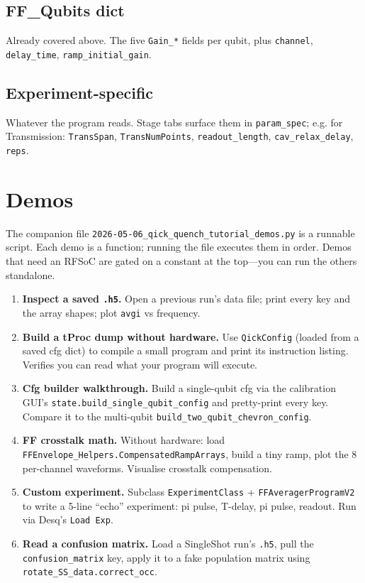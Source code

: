 \documentclass[11pt,letterpaper]{article}
\begin{document}
\subsection{FF\_Qubits dict}
Already covered above. The five \texttt{Gain\_*} fields per qubit, plus \texttt{channel}, \texttt{delay\_time}, \texttt{ramp\_initial\_gain}.

\subsection{Experiment-specific}
Whatever the program reads. Stage tabs surface them in \texttt{param\_spec}; e.g. for Transmission: \texttt{TransSpan}, \texttt{TransNumPoints}, \texttt{readout\_length}, \texttt{cav\_relax\_delay}, \texttt{reps}.

\section{Demos}
The companion file \texttt{2026-05-06\_qick\_quench\_tutorial\_demos.py} is a runnable script. Each demo is a function; running the file executes them in order. Demos that need an RFSoC are gated on a constant at the top---you can run the others standalone.

\begin{enumerate}[leftmargin=*]
  \item \textbf{Inspect a saved \texttt{.h5}.} Open a previous run's data file; print every key and the array shapes; plot \texttt{avgi} vs frequency.
  \item \textbf{Build a tProc dump without hardware.} Use \texttt{QickConfig} (loaded from a saved cfg dict) to compile a small program and print its instruction listing. Verifies you can read what your program will execute.
  \item \textbf{Cfg builder walkthrough.} Build a single-qubit cfg via the calibration GUI's \texttt{state.build\_single\_qubit\_config} and pretty-print every key. Compare it to the multi-qubit \texttt{build\_two\_qubit\_chevron\_config}.
  \item \textbf{FF crosstalk math.} Without hardware: load \texttt{FFEnvelope\_Helpers.CompensatedRampArrays}, build a tiny ramp, plot the 8 per-channel waveforms. Visualise crosstalk compensation.
  \item \textbf{Custom experiment.} Subclass \texttt{ExperimentClass} + \texttt{FFAveragerProgramV2} to write a 5-line ``echo'' experiment: pi pulse, T-delay, pi pulse, readout. Run via Desq's \texttt{Load Exp}.
  \item \textbf{Read a confusion matrix.} Load a SingleShot run's \texttt{.h5}, pull the \texttt{confusion\_matrix} key, apply it to a fake population matrix using \texttt{rotate\_SS\_data.correct\_occ}.
\end{enumerate}
\end{document}
